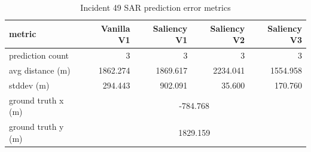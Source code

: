 \begin{table}[ht]
\centering
\caption{Incident 49 SAR prediction error metrics}
\label{tab:sar-incident-49}
\begin{tabular}{lrrrr}
\hline
metric & Vanilla V1 & Saliency V1 & Saliency V2 & Saliency V3 \\
\hline
prediction count & 3 & 3 & 3 & 3 \\
avg distance (m) & 1862.274 & 1869.617 & 2234.041 & 1554.958 \\
stddev (m) & 294.443 & 902.091 & 35.600 & 170.760 \\
ground truth x (m) & \multicolumn{4}{c}{-784.768} \\
ground truth y (m) & \multicolumn{4}{c}{1829.159} \\
\hline
\end{tabular}
\end{table}
